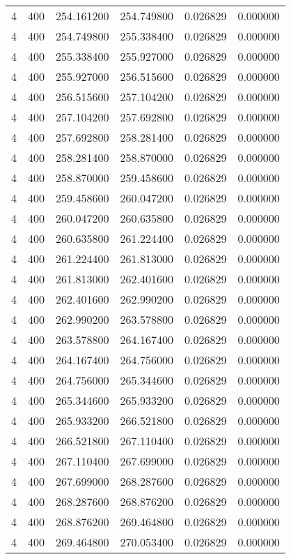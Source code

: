 \begin{longtable}{rrrrrr}
4 & 400 & 254.161200 & 254.749800 & 0.026829 & 0.000000 \\
4 & 400 & 254.749800 & 255.338400 & 0.026829 & 0.000000 \\
4 & 400 & 255.338400 & 255.927000 & 0.026829 & 0.000000 \\
4 & 400 & 255.927000 & 256.515600 & 0.026829 & 0.000000 \\
4 & 400 & 256.515600 & 257.104200 & 0.026829 & 0.000000 \\
4 & 400 & 257.104200 & 257.692800 & 0.026829 & 0.000000 \\
4 & 400 & 257.692800 & 258.281400 & 0.026829 & 0.000000 \\
4 & 400 & 258.281400 & 258.870000 & 0.026829 & 0.000000 \\
4 & 400 & 258.870000 & 259.458600 & 0.026829 & 0.000000 \\
4 & 400 & 259.458600 & 260.047200 & 0.026829 & 0.000000 \\
4 & 400 & 260.047200 & 260.635800 & 0.026829 & 0.000000 \\
4 & 400 & 260.635800 & 261.224400 & 0.026829 & 0.000000 \\
4 & 400 & 261.224400 & 261.813000 & 0.026829 & 0.000000 \\
4 & 400 & 261.813000 & 262.401600 & 0.026829 & 0.000000 \\
4 & 400 & 262.401600 & 262.990200 & 0.026829 & 0.000000 \\
4 & 400 & 262.990200 & 263.578800 & 0.026829 & 0.000000 \\
4 & 400 & 263.578800 & 264.167400 & 0.026829 & 0.000000 \\
4 & 400 & 264.167400 & 264.756000 & 0.026829 & 0.000000 \\
4 & 400 & 264.756000 & 265.344600 & 0.026829 & 0.000000 \\
4 & 400 & 265.344600 & 265.933200 & 0.026829 & 0.000000 \\
4 & 400 & 265.933200 & 266.521800 & 0.026829 & 0.000000 \\
4 & 400 & 266.521800 & 267.110400 & 0.026829 & 0.000000 \\
4 & 400 & 267.110400 & 267.699000 & 0.026829 & 0.000000 \\
4 & 400 & 267.699000 & 268.287600 & 0.026829 & 0.000000 \\
4 & 400 & 268.287600 & 268.876200 & 0.026829 & 0.000000 \\
4 & 400 & 268.876200 & 269.464800 & 0.026829 & 0.000000 \\
4 & 400 & 269.464800 & 270.053400 & 0.026829 & 0.000000 \\

\end{longtable}
